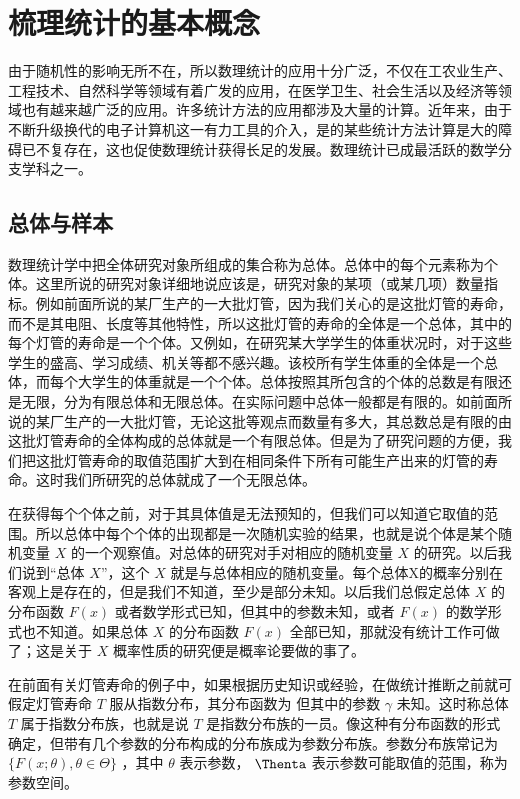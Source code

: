 \chapter{梳理统计的基本概念}
由于随机性的影响无所不在，所以数理统计的应用十分广泛，不仅在工农业生产、工程技术、自然科学等领域有着广发的应用，在医学卫生、社会生活以及经济等领域也有越来越广泛的应用。许多统计方法的应用都涉及大量的计算。近年来，由于不断升级换代的电子计算机这一有力工具的介入，是的某些统计方法计算是大的障碍已不复存在，这也促使数理统计获得长足的发展。数理统计已成最活跃的数学分支学科之一。

\section{总体与样本} 

数理统计学中把全体研究对象所组成的集合称为总体。总体中的每个元素称为个体。这里所说的研究对象详细地说应该是，研究对象的某项（或某几项）数量指标。例如前面所说的某厂生产的一大批灯管，因为我们关心的是这批灯管的寿命，而不是其电阻、长度等其他特性，所以这批灯管的寿命的全体是一个总体，其中的每个灯管的寿命是一个个体。又例如，在研究某大学学生的体重状况时，对于这些学生的盛高、学习成绩、机关等都不感兴趣。该校所有学生体重的全体是一个总体，而每个大学生的体重就是一个个体。总体按照其所包含的个体的总数是有限还是无限，分为有限总体和无限总体。在实际问题中总体一般都是有限的。如前面所说的某厂生产的一大批灯管，无论这批等观点而数量有多大，其总数总是有限的由这批灯管寿命的全体构成的总体就是一个有限总体。但是为了研究问题的方便，我们把这批灯管寿命的取值范围扩大到在相同条件下所有可能生产出来的灯管的寿命。这时我们所研究的总体就成了一个无限总体。

在获得每个个体之前，对于其具体值是无法预知的，但我们可以知道它取值的范围。所以总体中每个个体的出现都是一次随机实验的结果，也就是说个体是某个随机变量 $X$ 的一个观察值。对总体的研究对手对相应的随机变量 $X$ 的研究。以后我们说到“总体 $X$”，这个 $X$ 就是与总体相应的随机变量。每个总体X的概率分别在客观上是存在的，但是我们不知道，至少是部分未知。以后我们总假定总体 $X$ 的分布函数 $F(x)$ 或者数学形式已知，但其中的参数未知，或者 $F(x)$ 的数学形式也不知道。如果总体 $X$ 的分布函数 $F(x)$ 全部已知，那就没有统计工作可做了；这是关于 $X$ 概率性质的研究便是概率论要做的事了。

在前面有关灯管寿命的例子中，如果根据历史知识或经验，在做统计推断之前就可假定灯管寿命 $T$ 服从指数分布，其分布函数为
但其中的参数 $\gamma$ 未知。这时称总体 $T$ 属于指数分布族，也就是说 $T$ 是指数分布族的一员。像这种有分布函数的形式确定，但带有几个参数的分布构成的分布族成为参数分布族。参数分布族常记为 $\{F(x; \theta), \theta \in \Theta\}$ ，其中 $\theta$ 表示参数， $\Thenta$ 表示参数可能取值的范围，称为参数空间。

